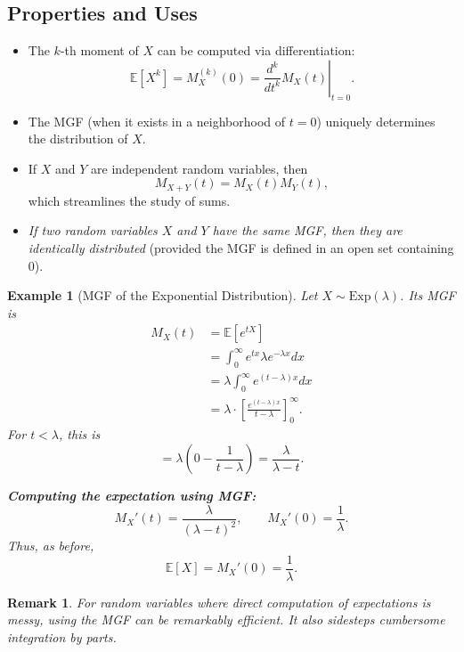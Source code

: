 \documentclass[12pt]{article}
\newtheorem{example}[definition]{Example}
\newtheorem{remark}[definition]{Remark}
\begin{document}
\subsection{Properties and Uses}

\begin{itemize}
    \item The $k$-th moment of $X$ can be computed via differentiation:
        \[
            \mathbb{E}[X^k] = M_X^{(k)}(0) = \left.\frac{d^k}{dt^k} M_X(t)\right|_{t=0}.
        \]
    \item The MGF (when it exists in a neighborhood of $t=0$) uniquely determines the distribution of $X$.
    \item If $X$ and $Y$ are independent random variables, then
        \[
            M_{X+Y}(t) = M_X(t) M_Y(t),
        \]
        which streamlines the study of sums.
    \item \emph{If two random variables $X$ and $Y$ have the same MGF, then they are identically distributed} (provided the MGF is defined in an open set containing $0$).
\end{itemize}

\begin{example}[MGF of the Exponential Distribution]
    Let $X \sim \mathrm{Exp}(\lambda)$. Its MGF is
    \begin{align*}
        M_X(t) &= \mathbb{E}\left[e^{t X}\right] \\
               &= \int_{0}^{\infty} e^{t x} \lambda e^{-\lambda x} dx \\
               &= \lambda \int_{0}^{\infty} e^{(t - \lambda)x} dx \\
               &= \lambda \cdot \left[ \frac{e^{(t-\lambda)x}}{t - \lambda} \right]_{0}^{\infty}.
    \end{align*}
    For $t < \lambda$, this is
    \[
    = \lambda \left( 0 - \frac{1}{t - \lambda} \right ) = \frac{\lambda}{\lambda - t}.
    \]

    \textbf{Computing the expectation using MGF:}
    \[
    M_X'(t) = \frac{\lambda}{(\lambda - t)^2},\qquad M_X'(0) = \frac{1}{\lambda}.
    \]
    Thus, as before,
    \[
        \mathbb{E}[X] = M_X'(0) = \frac{1}{\lambda}.
    \]
\end{example}

\begin{remark}
    For random variables where direct computation of expectations is messy, using the MGF can be remarkably efficient. It also sidesteps cumbersome integration by parts.
\end{remark}
\end{document}
